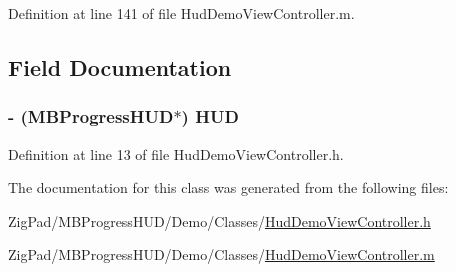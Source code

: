 Definition at line 141 of file HudDemoViewController.m.



\subsection{Field Documentation}
\hypertarget{interface_hud_demo_view_controller_a62209f8d829db91e9c588dee85158379}{
\subsubsection[{HUD}]{\setlength{\rightskip}{0pt plus 5cm}-\/ ({\bf MBProgressHUD}$\ast$) {\bf HUD}}}
\label{interface_hud_demo_view_controller_a62209f8d829db91e9c588dee85158379}


Definition at line 13 of file HudDemoViewController.h.



The documentation for this class was generated from the following files:\begin{DoxyCompactItemize}
\item 
ZigPad/MBProgressHUD/Demo/Classes/\hyperlink{_hud_demo_view_controller_8h}{HudDemoViewController.h}\item 
ZigPad/MBProgressHUD/Demo/Classes/\hyperlink{_hud_demo_view_controller_8m}{HudDemoViewController.m}\end{DoxyCompactItemize}
